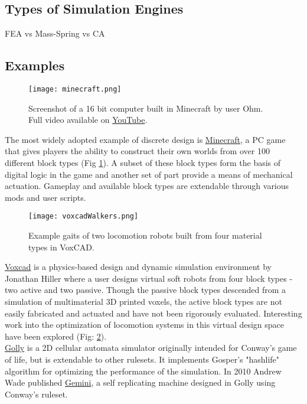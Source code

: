 {\subsection{Types of Simulation Engines}

FEA vs Mass-Spring vs CA

\subsection{Examples}

\begin{figure}
  \texttt{[image: minecraft.png]}
  \caption{Screenshot of a 16 bit computer built in Minecraft by user Ohm.  Full video available on \href{https://www.youtube.com/watch?v=KzrFzkb3A4o}{YouTube}.}
  \label{fig:minecraft}
\end{figure}
The most widely adopted example of discrete design is \href{https://minecraft.net/}{Minecraft}, a PC game that gives players the ability to construct their own worlds from over 100 different block types (Fig \ref{fig:minecraft}).  A subset of these block types form the basis of digital logic in the game and another set of part provide a means of mechanical actuation.  Gameplay and available block types are extendable through various mods and user scripts.
\\

\begin{figure}
  \texttt{[image: voxcadWalkers.png]}
  \caption{Example gaits of two locomotion robots built from four material types in VoxCAD\cite{Cheney2013b}.}
  \label{fig:voxcadWalkers}
\end{figure}
\href{http://www.voxcad.com/}{Voxcad} is a physics-based design and dynamic simulation environment by Jonathan Hiller where a user designs virtual soft robots from four block types - two active and two passive\cite{Hiller2014a}.  Though the passive block types descended from a simulation of multimaterial 3D printed voxels, the active block types are not easily fabricated and actuated\cite{Hiller2012} and have not been rigorously evaluated.  Interesting work into the optimization of locomotion systems in this virtual design space have been explored (Fig: \ref{fig:voxcadWalkers})\cite{Cheney2013b}\cite{Cheney2013}\cite{Cheney2015}.
\\


\href{http://golly.sourceforge.net/}{Golly} is a 2D cellular automata simulator originally intended for Conway's game of life, but is extendable to other rulesets.  It implements Gosper's "hashlife" algorithm for optimizing the performance of the simulation\cite{Gosper1984}.  In 2010 Andrew Wade published \href{https://www.youtube.com/watch?v=A8B5MbHPlH0}{Gemini}, a self replicating machine designed in Golly using Conway's ruleset.
\\

}
